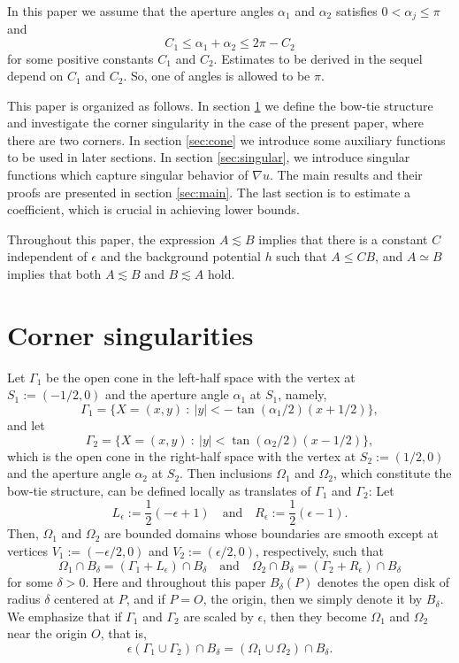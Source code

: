 \documentclass[11pt,a4paper]{article}
\numberwithin{equation}{section}
\newcommand{\Ga}{\alpha}
\newcommand{\Gd}{\delta}
\newcommand{\Ge}{\epsilon}
\newcommand{\GG}{\Gamma}
\newcommand{\GO}{\Omega}
\newcommand{\beq}{\begin{equation}}
\newcommand{\eeq}{\end{equation}}
\begin{document}
In this paper we assume that the aperture angles $\Ga_1$ and $\Ga_2$ satisfies $0< \Ga_j \le \pi$ and
\beq\label{anglecond}
C_1 \le \Ga_1+\Ga_2 \le 2\pi - C_2
\eeq
for some positive constants $C_1$ and $C_2$. Estimates to be derived in the sequel depend on $C_1$ and $C_2$. So, one of angles is allowed to be $\pi$.

This paper is organized as follows. In section \ref{sec:corner} we define the bow-tie structure and investigate the corner singularity in the case of the present paper, where there are two corners. In section \ref{sec:cone} we introduce some auxiliary functions to be used in later sections. In section \ref{sec:singular}, we introduce singular functions which capture singular behavior of $\nabla u$. The main results and their proofs are presented in section \ref{sec:main}.  The last section is to estimate a coefficient, which is crucial in achieving lower bounds.

Throughout this paper, the expression $A \lesssim B$ implies that there is a constant $C$ independent of $\Ge$ and the background potential $h$ such that $A \le CB$, and $A \simeq B$ implies that both $A \lesssim B$ and $B \lesssim A$ hold.

\section{Corner singularities}\label{sec:corner}

Let $\GG_1$ be the open cone in the left-half space with the vertex at $S_1:=(-1/2,0)$ and the aperture angle $\Ga_1$ at $S_1$, namely,
\beq
\GG_1= \{ X=(x,y) ~:~ |y| < -\tan(\Ga_1/2) (x+1/2) \},
\eeq
and let
\beq
\GG_2= \{ X=(x,y) ~:~ |y| < \tan(\Ga_2/2) (x-1/2) \},
\eeq
which is the open cone in the right-half space with the vertex at $S_2:=(1/2,0)$ and the aperture angle $\Ga_2$ at $S_2$. Then inclusions $\GO_1$ and $\GO_2$, which constitute the bow-tie structure, can be defined locally as translates of $\GG_1$ and $\GG_2$: Let
\beq\label{LGe}
L_\Ge:= \frac{1}{2}(-\Ge +1) \quad\mbox{and}\quad R_\Ge:= \frac{1}{2}(\Ge-1).
\eeq
Then, $\GO_1$ and $\GO_2$ are bounded domains whose boundaries are smooth except at vertices $V_1:=(-\Ge/2,0)$ and $V_2:=(\Ge/2,0)$, respectively, such that
\beq\label{BGd}
\GO_1 \cap B_\Gd= (\GG_1+L_\Ge) \cap B_\Gd \quad\mbox{and}\quad \GO_2 \cap B_\Gd= (\GG_2+R_\Ge) \cap B_\Gd
\eeq
for some $\Gd>0$. Here and throughout this paper $B_\Gd(P)$ denotes the open disk of radius $\Gd$ centered at $P$, and if $P=O$, the origin, then we simply denote it by $B_\Gd$. We emphasize that if $\GG_1$ and $\GG_2$ are scaled by $\Ge$, then they become $\GO_1$ and $\GO_2$ near the origin $O$, that is,
$$
\Ge (\GG_1 \cup \GG_2) \cap B_\Gd = (\GO_1 \cup \GO_2) \cap B_\Gd.
$$
\end{document}

